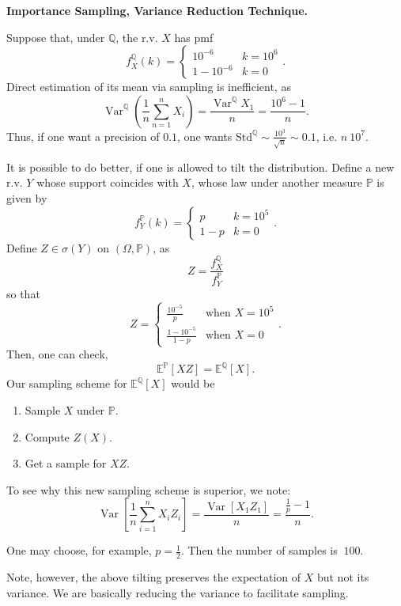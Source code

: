 \begin{example}
	\textbf{Importance Sampling, Variance Reduction Technique.}

	Suppose that, under $\mathbb{Q}$, the r.v. $X$ has pmf
	\[
		f_X^{\mathbb{Q}}(k) = \begin{cases}
			10^{-6} & k = 10^6 \\
			1 - 10^{-6} & k = 0
		\end{cases}
	.\] 
	Direct estimation of its mean via sampling is inefficient, as
	\[
		\operatorname{Var}^{\mathbb{Q}}\left( \frac{1}{n} \sum_{n = 1}^n X_i \right)  = \frac{\operatorname{Var} ^{\mathbb{Q}}X_1}{n} = \frac{10^6 - 1}{n}
	.\] 
	Thus, if one want a precision of $0.1$, one wants  $\text{Std}^{\mathbb{Q}} \sim  \frac{10^3}{\sqrt{n} } \sim 0.1$, i.e. $n ~ 10^{7}$.
	
	It is possible to do better, if one is allowed to tilt the distribution. Define a new r.v.  $Y$ whose support coincides with $X$, whose law under  another measure $\mathbb{P}$ is given by
	\[
		f_Y^{\mathbb{P}}(k) = \begin{cases}
			p & k = 10^5 \\
			1 - p & k = 0
		\end{cases}
	.\] 
	Define $Z \in \sigma(Y)$ on $(\Omega, \mathbb{P})$, as
	\[
		Z = \frac{f_X^{\mathbb{Q}}}{f_Y^{\mathbb{P}}}
	\]
	so that
	\[
		Z = \begin{cases}
			\frac{10^{-5}}{p} & \text{when }X = 10^5 \\
			\frac{1 - 10^{-5}}{1 - p} & \text{when } X = 0
		\end{cases}
	.\] 
	Then, one can check,
	\[
		\mathbb{E}^{\mathbb{P}}[X Z] = \mathbb{E}^{\mathbb{Q}}[X]
	.\] 
	Our sampling scheme for $\mathbb{E}^{\mathbb{Q}}[X]$ would be
	\begin{enumerate}
		\item Sample $X$ under $\mathbb{P}$.
		\item Compute $Z(X)$.
		\item Get a sample for $XZ$.
	\end{enumerate}
	To see why this new sampling scheme is superior, we note:
	\[
		\operatorname{Var} \left[ \frac{1}{n} \sum_{i=1}^{n} X_i Z_i \right] = \frac{\operatorname{Var} \left[ X_1 Z_1 \right] }{n} = \frac{\frac{1}{p} - 1}{n}
	.\] 

	One may choose, for example, $p = \frac{1}{2}$. Then the number of samples is $~100$.

	Note, however, the above tilting preserves the expectation of  $X $ but not its variance. We are basically reducing the variance to facilitate sampling.
\end{example}



